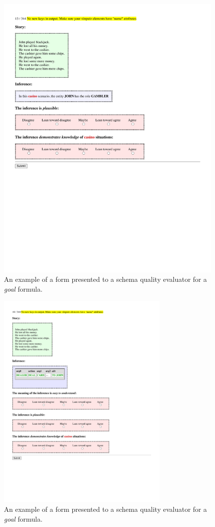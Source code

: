 \begin{figure}
    \centering
    \includegraphics[width=\textwidth]{CH5_eval/role_inf.pdf}
    \caption{An example of a form presented to a schema quality evaluator for a \textit{goal} formula.}
    \label{fig:role_inf_eval}
\end{figure}

\begin{figure}
    \centering
    \includegraphics[width=0.75\textwidth]{CH5_eval/step_inf.pdf}
    \caption{An example of a form presented to a schema quality evaluator for a \textit{goal} formula.}
    \label{fig:step_inf_eval}
\end{figure}